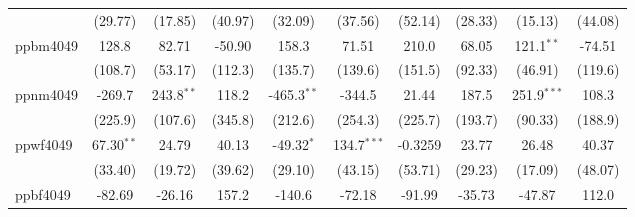 \begin{table}[htbp]
\begin{tabular}{lccccccccc}
                                     & (29.77)                      & (17.85)                       & (40.97)                     & (32.09)                   & (37.56)                       & (52.14)                      & (28.33)                       & (15.13)                      & (44.08)\\   
      ppbm4049                       & 128.8                        & 82.71                         & -50.90                      & 158.3                     & 71.51                         & 210.0                        & 68.05                         & 121.1$^{**}$                 & -74.51\\   
                                     & (108.7)                      & (53.17)                       & (112.3)                     & (135.7)                   & (139.6)                       & (151.5)                      & (92.33)                       & (46.91)                      & (119.6)\\   
      ppnm4049                       & -269.7                       & 243.8$^{**}$                  & 118.2                       & -465.3$^{**}$             & -344.5                        & 21.44                        & 187.5                         & 251.9$^{***}$                & 108.3\\   
                                     & (225.9)                      & (107.6)                       & (345.8)                     & (212.6)                   & (254.3)                       & (225.7)                      & (193.7)                       & (90.33)                      & (188.9)\\   
      ppwf4049                       & 67.30$^{**}$                 & 24.79                         & 40.13                       & -49.32$^{*}$              & 134.7$^{***}$                 & -0.3259                      & 23.77                         & 26.48                        & 40.37\\   
                                     & (33.40)                      & (19.72)                       & (39.62)                     & (29.10)                   & (43.15)                       & (53.71)                      & (29.23)                       & (17.09)                      & (48.07)\\   
      ppbf4049                       & -82.69                       & -26.16                        & 157.2                       & -140.6                    & -72.18                        & -91.99                       & -35.73                        & -47.87                       & 112.0\\   

\end{tabular}
\end{table}
